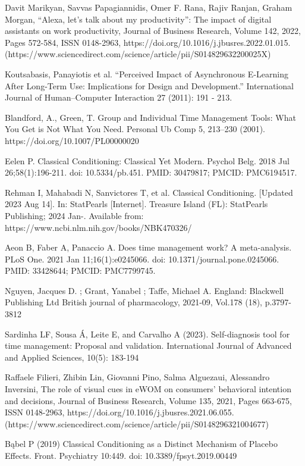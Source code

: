 \documentclass[sigconf]{acmart}
\begin{document}
\begin{thebibliography}{100}
 Davit Marikyan, Savvas Papagiannidis, Omer F. Rana, Rajiv Ranjan, Graham Morgan,
“Alexa, let’s talk about my productivity”: The impact of digital assistants on work productivity,
Journal of Business Research,
Volume 142,
2022,
Pages 572-584,
ISSN 0148-2963,
https://doi.org/10.1016/j.jbusres.2022.01.015.
(https://www.sciencedirect.com/science/article/pii/S014829632200025X)

 Koutsabasis, Panayiotis et al. “Perceived Impact of Asynchronous E-Learning After Long-Term Use: Implications for Design and Development.” International Journal of Human–Computer Interaction 27 (2011): 191 - 213.

Blandford, A., Green, T. Group and Individual Time Management Tools: What You Get is Not What You Need. Personal Ub Comp 5, 213–230 (2001). https://doi.org/10.1007/PL00000020

Eelen P. Classical Conditioning: Classical Yet Modern. Psychol Belg. 2018 Jul 26;58(1):196-211. doi: 10.5334/pb.451. PMID: 30479817; PMCID: PMC6194517.

Rehman I, Mahabadi N, Sanvictores T, et al. Classical Conditioning. [Updated 2023 Aug 14]. In: StatPearls [Internet]. Treasure Island (FL): StatPearls Publishing; 2024 Jan-. Available from: https://www.ncbi.nlm.nih.gov/books/NBK470326/

Aeon B, Faber A, Panaccio A. Does time management work? A meta-analysis. PLoS One. 2021 Jan 11;16(1):e0245066. doi: 10.1371/journal.pone.0245066. PMID: 33428644; PMCID: PMC7799745.

Nguyen, Jacques D. ; Grant, Yanabel ; Taffe, Michael A.
England: Blackwell Publishing Ltd
British journal of pharmacology, 2021-09, Vol.178 (18), p.3797-3812

Sardinha LF, Sousa Á, Leite E, and Carvalho A (2023). Self-diagnosis tool for time management: Proposal and validation. International Journal of Advanced and Applied Sciences, 10(5): 183-194

Raffaele Filieri, Zhibin Lin, Giovanni Pino, Salma Alguezaui, Alessandro Inversini,
The role of visual cues in eWOM on consumers’ behavioral intention and decisions,
Journal of Business Research,
Volume 135,
2021,
Pages 663-675,
ISSN 0148-2963,
https://doi.org/10.1016/j.jbusres.2021.06.055.
(https://www.sciencedirect.com/science/article/pii/S0148296321004677)

 Bąbel P (2019) Classical Conditioning as a Distinct Mechanism of Placebo Effects. Front. Psychiatry 10:449. doi: 10.3389/fpsyt.2019.00449
\end{thebibliography}
\end{document}
